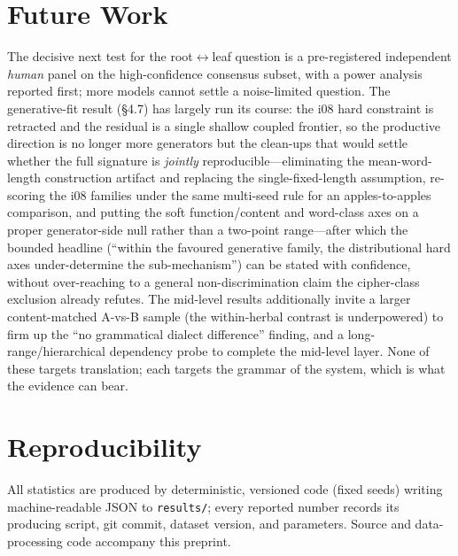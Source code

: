 \documentclass[11pt]{article}
\begin{document}
\section{Future Work}
The decisive next test for the root$\leftrightarrow$leaf question is a pre-registered
independent \emph{human} panel on the high-confidence consensus subset, with a power
analysis reported first; more models cannot settle a noise-limited question. The
generative-fit result (\S4.7) has largely run its course: the i08 hard constraint is
retracted and the residual is a single shallow coupled frontier, so the productive direction
is no longer more generators but the clean-ups that would settle whether the full signature
is \emph{jointly} reproducible---eliminating the mean-word-length construction artifact and
replacing the single-fixed-length assumption, re-scoring the i08 families under the same
multi-seed rule for an apples-to-apples comparison, and putting the soft function/content and
word-class axes on a proper generator-side null rather than a two-point range---after which
the bounded headline (``within the favoured generative family, the distributional hard axes
under-determine the sub-mechanism'') can be stated with confidence, without over-reaching to
a general non-discrimination claim the cipher-class exclusion already refutes. The mid-level
results additionally
invite a larger content-matched A-vs-B sample (the within-herbal contrast is
underpowered) to firm up the ``no grammatical dialect difference'' finding, and a
long-range/hierarchical dependency probe to complete the mid-level layer. None of these
targets translation; each targets the grammar of the system, which is what the evidence
can bear.

\section*{Reproducibility}
All statistics are produced by deterministic, versioned code (fixed seeds) writing
machine-readable JSON to \texttt{results/}; every reported number records its
producing script, git commit, dataset version, and parameters. Source and
data-processing code accompany this preprint.



\end{document}
